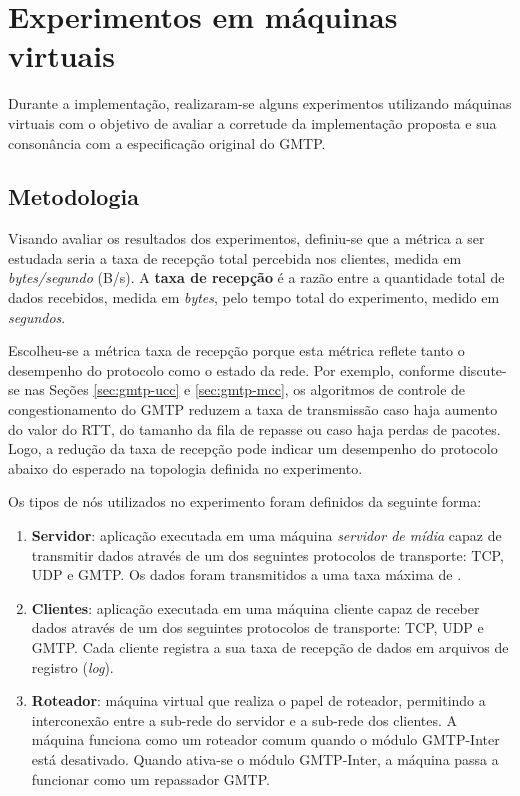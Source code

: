 \section{Experimentos em máquinas virtuais}
\label{sec:experimentos-vm}

Durante a implementação, realizaram-se alguns experimentos utilizando máquinas virtuais com o objetivo de avaliar a corretude da implementação proposta e sua consonância com a especificação original do GMTP.

\subsection{Metodologia}
\label{subsec:metodologia-vm}

Visando avaliar os resultados dos experimentos, definiu-se que a métrica a ser estudada seria a taxa de recepção total percebida nos clientes, medida em \textit{bytes/segundo} (B/s).
A \textbf{taxa de recepção} é a razão entre a quantidade total de dados recebidos, medida em \textit{bytes}, pelo tempo total do experimento, medido em \textit{segundos}.

Escolheu-se a métrica taxa de recepção porque esta métrica reflete tanto o desempenho do protocolo como o estado da rede.
Por exemplo, conforme discute-se nas Seções \ref{sec:gmtp-ucc} e \ref{sec:gmtp-mcc}, os algoritmos de controle de congestionamento do GMTP reduzem a taxa de transmissão caso haja aumento do valor do RTT, do tamanho da fila de repasse ou caso haja perdas de pacotes. 
Logo, a redução da taxa de recepção pode indicar um desempenho do protocolo abaixo do esperado na topologia definida no experimento.

Os tipos de nós utilizados no experimento foram definidos da seguinte forma:
\begin{enumerate}
\item \textbf{Servidor}: aplicação executada em uma máquina \textit{servidor de mídia} capaz de transmitir dados através de um dos seguintes protocolos de transporte: TCP, UDP e GMTP. Os dados foram transmitidos a uma taxa máxima de .
\item \textbf{Clientes}: aplicação executada em uma máquina cliente capaz de receber dados através de um dos seguintes protocolos de transporte: TCP, UDP e GMTP. Cada cliente registra a sua taxa de recepção de dados em arquivos de registro (\textit{log}).
\item \textbf{Roteador}: máquina virtual que realiza o papel de roteador, permitindo a interconexão entre a sub-rede do servidor e a sub-rede dos clientes. 
A máquina funciona como um roteador comum quando o módulo GMTP-Inter está desativado. Quando ativa-se o módulo GMTP-Inter, a máquina passa a funcionar como um repassador GMTP.
\end{enumerate}

